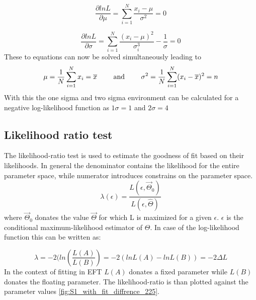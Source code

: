 \documentclass[../Bachelorarbeit.tex]{subfiles}
\begin{document}
\begin{equation}
    \frac{\partial ln L}{\partial \mu} = \sum_{i = 1}^{N} \frac{x_{i}-\mu}{\sigma^{2}} = 0
\end{equation}

\begin{equation}
    \frac{\partial ln L}{\partial \sigma} = \sum_{i = 1}^{N} \frac{(x_{i}-\mu)^{2}}{\sigma_{i}^{3}} - \frac{1}{\sigma} = 0
\end{equation}
These to equations can now be solved simultaneously leading to
\begin{equation}
    \mu = \frac{1}{N} \sum^{N}_{i = 1} x_{i} = \overline{x} \qquad \textnormal{ and } \qquad \sigma^{2} = \frac{1}{N} \sum^{N}_{i = 1} (x_{i}-\overline{x})^{2} = n
\end{equation}
With this the one sigma and two sigma environment can be calculated for a negative log-likelihood function as $1\sigma=1$ and $2\sigma=4$ \cite{Erdmann.2020}
\subsection{Likelihood ratio test}
The likelihood-ratio test is used to estimate the goodness of fit based on their likelihoods. In general the denominator contains the likelihood for the entire parameter space, while numerator introduces constrains on the parameter space.
\begin{equation}
    \lambda(\epsilon) = \frac{L(\epsilon,\overrightarrow{\Theta}_{0})}{L(\epsilon,\hat{\Theta})}
\end{equation}
where $\overrightarrow{\Theta}_{0}$ donates the value $\overrightarrow{\Theta}$ for which L is maximized for a given $\epsilon$. $\epsilon$ is the
conditional maximum-likelihood estimator of $\Theta$. In case of the log-likelihood function this can be written as:

\begin{equation}
    \lambda = -2(ln(\frac{L(A)}{L(B)})= -2(ln L(A)-ln L(B))=-2 \Delta L
\end{equation}
In the context of fitting in EFT $L(A)$ donates a fixed parameter while $L(B)$ donates the floating parameter. The likelihood-ratio is than plotted against the parameter values  \ref{fig:S1_with_fit_diffrence_225}.
\end{document}

